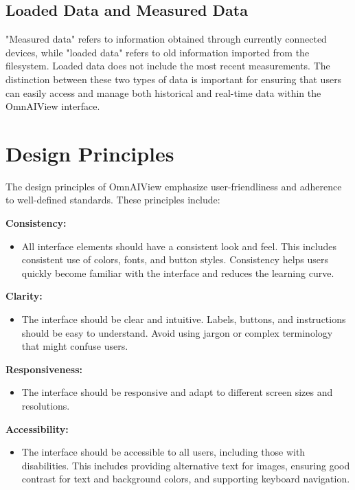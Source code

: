 \documentclass[]{scrreprt}
\begin{document}
\subsection{Loaded Data and Measured Data} \label{cap:loadedData}

"Measured data" refers to information obtained through currently connected devices, while "loaded data" refers to old information imported from the filesystem. Loaded data does not include the most recent measurements. The distinction between these two types of data is important for ensuring that users can easily access and manage both historical and real-time data within the OmnAIView interface.

\section{Design Principles} \label{cap:Designprinciples}

The design principles of OmnAIView emphasize user-friendliness and adherence to well-defined standards. These principles include:

\textbf{Consistency:}
\begin{itemize}
    \item All interface elements should have a consistent look and feel. This includes consistent use of colors, fonts, and button styles. Consistency helps users quickly become familiar with the interface and reduces the learning curve.
\end{itemize}

\textbf{Clarity:}
\begin{itemize}
    \item The interface should be clear and intuitive. Labels, buttons, and instructions should be easy to understand. Avoid using jargon or complex terminology that might confuse users.
\end{itemize}

\textbf{Responsiveness:}
\begin{itemize}
    \item The interface should be responsive and adapt to different screen sizes and resolutions. 
\end{itemize}

\textbf{Accessibility:}
    \begin{itemize}
        \item The interface should be accessible to all users, including those with disabilities. This includes providing alternative text for images, ensuring good contrast for text and background colors, and supporting keyboard navigation.
    \end{itemize}
    
\end{document}
